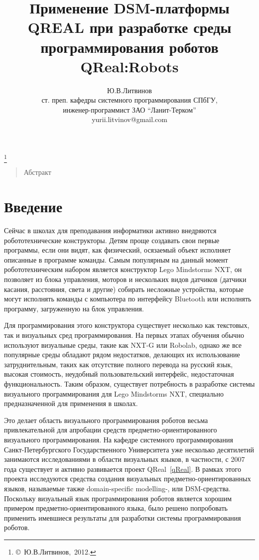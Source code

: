 \documentclass[a4paper]{article}
\title{Применение DSM-платформы QREAL при разработке среды программирования роботов QReal:Robots}
\author{Ю.В.Литвинов \\ ст. преп. кафедры системного программирования СПбГУ, \\ инженер-программист ЗАО ``Ланит-Терком'' \\ yurii.litvinov@gmail.com}
\date{}
\begin{document}
\maketitle
\thispagestyle{empty}

\renewcommand{\thefootnote}{}
\footnote{\small{\copyright~Ю.В.Литвинов,~2012.}}
\renewcommand{\thefootnote}{\arabic{footnote}}
\setcounter{footnote}{0}

\begin{quote}
\small\noindent
Абстракт
\end{quote}

\section*{Введение}
Сейчас в школах для преподавания информатики активно внедряются робототехнические конструкторы. Детям проще создавать свои первые программы, если они видят, как физический, осязаемый объект исполняет описанные в программе команды. Самым популярным на данный момент робототехническим набором является конструктор Lego Mindstorms NXT, он позволяет из блока управления, моторов и нескольких видов датчиков (датчики касания, расстояния, света и другие) собирать несложные устройства, которые могут исполнять команды с компьютера по интерфейсу Bluetooth или исполнять программу, загруженную на блок управления.

Для программирования этого конструктора существует несколько как текстовых, так и визуальных сред программирования. На первых этапах обучения обычно используют визуальные среды, такие как NXT-G или Robolab, однако же все популярные среды обладают рядом недостатков, делающих их использование затруднительным, таких как отсутствие полного перевода на русский язык, высокая стоимость, неудобный пользовательский интерфейс, недостаточная функциональность. Таким образом, существует потребность в разработке системы визуального программирования для Lego Mindstorms NXT, специально предназначенной для применения в школах.

Это делает область визуального программирования роботов весьма привлекательной для апробации средств предметно-ориентированного визуального программирования. На кафедре системного программирования Санкт-Петербургского Государственного Университета уже несколько десятилетий занимаются исследованиями в области визуальных языков, в частности, с 2007 года существует и активно развивается проект QReal~\ref{qReal}. В рамках этого проекта исследуются средства создания визуальных предметно-ориентированных языков, называемые также domain-specific modelling-, или DSM-средства. Поскольку визуальный язык программирования роботов является хорошим примером предметно-ориентированного языка, было решено попробовать применить имевшиеся результаты для разработки системы программирования роботов. 
\end{document}
